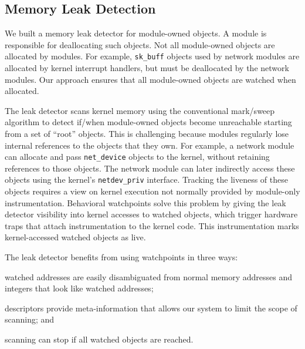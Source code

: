 \documentclass[letterpaper,twocolumn,10pt]{article}
\begin{document}
\subsection{Memory Leak Detection\label{sec:memory_leaks}}
We built a memory leak detector for module-owned objects. A module is responsible for deallocating such objects. Not all module-owned objects are allocated by modules. For example, \texttt{sk\_buff} objects used by network modules are allocated by kernel interrupt handlers, but must be deallocated by the network modules. Our approach ensures that all module-owned objects are watched when allocated.

The leak detector scans kernel memory using the conventional mark/sweep algorithm \cite{Boehm:1991:MPG:113445.113459} to detect if/when module-owned objects become unreachable starting from a set of ``root'' objects. This is challenging because modules regularly lose internal references to the objects that they own. For example, a network module can allocate and pass \texttt{net\_device} objects to the kernel, without retaining references to those objects. The network module can later indirectly access these objects using the kernel's \texttt{netdev\_priv} interface. Tracking the liveness of these objects requires a view on kernel execution not normally provided by module-only instrumentation. Behavioral watchpoints solve this problem by giving the leak detector visibility into kernel accesses to watched objects, which trigger hardware traps that attach instrumentation to the kernel code. This instrumentation marks kernel-accessed watched objects as live.

The leak detector benefits from using watchpoints in three ways: \begin{inparaenum}[i)]
	\item watched addresses are easily disambiguated from normal memory addresses and integers that look like watched addresses;
	\item descriptors provide meta-information that allows our system to limit the scope of scanning; and
	\item scanning can stop if all watched objects are reached.
\end{inparaenum}

\end{document}
